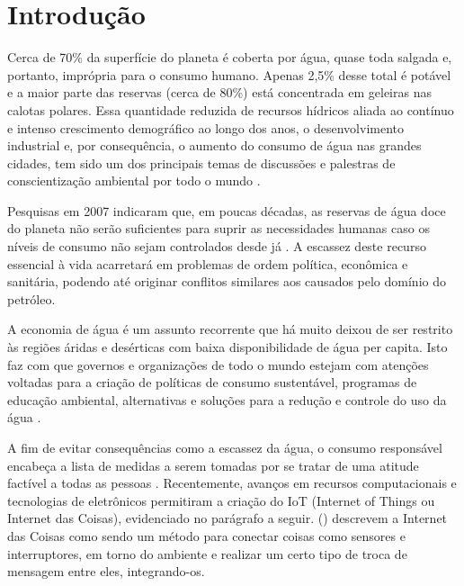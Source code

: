 \chapter[Introdução]{Introdução}

Cerca de 70\% da superfície do planeta é coberta por água, quase toda salgada e, portanto, imprópria para o consumo humano. Apenas 2,5\% desse total é potável e a maior parte das reservas (cerca de 80\%) está concentrada em geleiras nas calotas polares. 
Essa quantidade reduzida de recursos hídricos aliada ao contínuo e intenso crescimento demográfico ao longo dos anos, o desenvolvimento industrial e, por consequência, o aumento do consumo de água nas grandes cidades, tem sido um dos principais temas de discussões e palestras de conscientização ambiental por todo o mundo \cite{aguaconsumo}.

Pesquisas em 2007 indicaram que, em poucas décadas, as reservas de água doce do planeta não serão suficientes para suprir as necessidades humanas caso os níveis de consumo não sejam controlados desde já \cite{Diarias2007}. A escassez deste recurso essencial à vida acarretará em problemas de ordem política, econômica e sanitária, podendo até originar conflitos similares aos causados pelo domínio do petróleo.

A economia de água é um assunto recorrente que há muito deixou de ser restrito às regiões áridas e desérticas com baixa disponibilidade de água per capita. Isto faz com que governos e organizações de todo o mundo estejam com atenções voltadas para a criação de políticas de consumo sustentável, programas de educação ambiental, alternativas e soluções para a redução e controle do uso da água \cite{ferreirasistema}.

A fim de evitar consequências como a escassez da água, o consumo
responsável encabeça a lista de medidas a serem tomadas por se tratar de uma atitude factível a todas as pessoas \cite{Diarias2007}. Recentemente, avanços em recursos computacionais e tecnologias de eletrônicos permitiram a criação  do IoT (Internet of Things ou Internet das Coisas), evidenciado no parágrafo a seguir. \citeauthor{Perumal2016} (\citeyear{Perumal2016}) descrevem a Internet das Coisas como sendo um método para conectar coisas como sensores e interruptores, em torno do ambiente e realizar um certo tipo de troca de mensagem entre eles, integrando-os.

